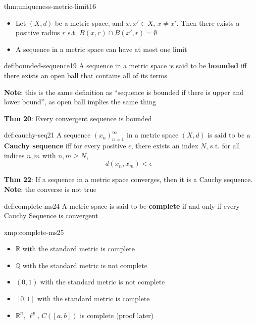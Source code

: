 \documentclass[landscape, 8pt]{extarticle}
\begin{document}
\begin{multicols}{3}
\begin{thm}{thm:uniqueness-metric-limit}{16}
    \begin{itemize}
        \item Let $(X,d)$ be a metric space, and $x,x'\in X,\,x\ne x'$. Then there exists a positive radius $r$ s.t. $B(x,r)\cap B(x',r) = \emptyset$
        \item A sequence in a metric space can have at most one limit
    \end{itemize}
\end{thm}

\begin{dfn}{def:bounded-sequence}{19}
    A sequence in a metric space is said to be \textbf{bounded} iff there exists an open ball that contains all of its terms

    \longrule{0.08ex}
    \textbf{Note}: this is the same definition as ``sequence is bounded if there is upper and lower bound'', as open ball implies the same thing

    \longrule{0.08ex}
    \textbf{Thm 20}: Every convergent sequence is bounded
\end{dfn}


\begin{dfn}{def:cauchy-seq}{21}
    A sequence $(x_{n})^{\infty}_{n=1}$ in a metric space $(X,d)$ is said to be a \textbf{Cauchy sequence} iff for every positive $\epsilon$, there exists an index $N$, s.t. for all indices $n,m$ with $n,m\ge N$,
    \[d(x_{n}, x_{m}) < \epsilon\]

    \longrule{0.08ex}
    \textbf{Thm 22}: If a sequence in a metric space converges, then it is a Cauchy sequence. \textbf{Note}: the converse is not true
\end{dfn}

\begin{dfn}{def:complete-ms}{24}
    A metric space is said to be \textbf{complete} if and only if every Cauchy Sequence is convergent
\end{dfn}

\begin{xmp}{xmp:complete-ms}{25}
    \begin{itemize}
        \item $\mathbb{R}$ with the standard metric is complete
        \item $\mathbb{Q}$ with the standard metric is not complete
        \item $(0,1)$ with the standard metric is not complete
        \item $[0,1]$ with the standard metric is complete
        \item $\mathbb{R}^{n},\,\ell^{p},\,C([a,b])$ is complete (proof later)
    \end{itemize} 
\end{xmp}


\end{multicols}
\end{document}

